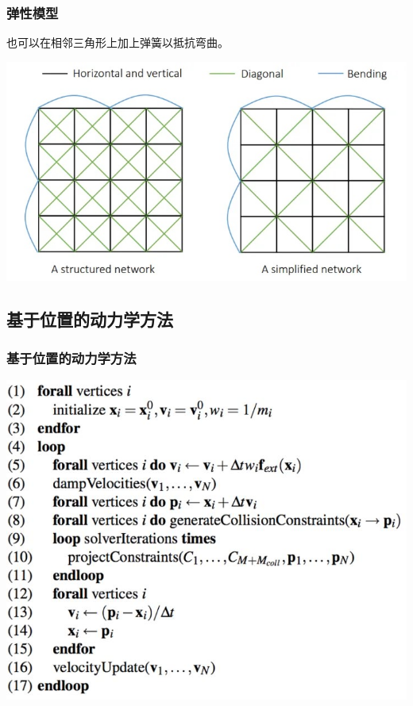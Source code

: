 \documentclass[aspectratio=43]{ctexbeamer}
\begin{document}
\begin{frame}
  \frametitle{弹性模型}
		也可以在相邻三角形上加上弹簧以抵抗弯曲。

        \begin{center}
            \includegraphics[width=1.0\linewidth]{./fig/三种弹簧.jpg}
        \end{center}
\end{frame}

\subsection{基于位置的动力学方法}
\begin{frame}
  \frametitle{基于位置的动力学方法}
        \begin{center}
            \includegraphics[width=0.8\linewidth]{./fig/PBD算法.jpg}
        \end{center}
\end{frame}
\end{document}
